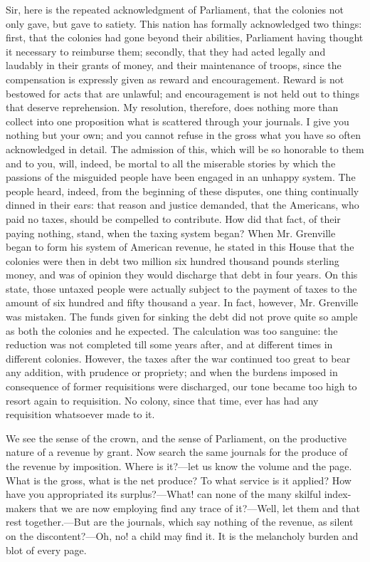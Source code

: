 Sir, here is the repeated acknowledgment of Parliament, that the colonies not only gave, but gave to satiety. This nation has formally acknowledged two things: first, that the colonies had gone beyond their abilities, Parliament having thought it necessary to reimburse them; secondly, that they had acted legally and laudably in their grants of money, and their maintenance of troops, since the compensation is expressly given as reward and encouragement. Reward is not bestowed for acts that are unlawful; and encouragement is not held out to things that deserve reprehension. My resolution, therefore, does nothing more than collect into one proposition what is scattered through your journals. I give you nothing but your own; and you cannot refuse in the gross what you have so often acknowledged in detail. The admission of this, which will be so honorable to them and to you, will, indeed, be mortal to all the miserable stories by which the passions of the misguided people have been engaged in an unhappy system. The people heard, indeed, from the beginning of these disputes, one thing continually dinned in their ears: that reason and justice demanded, that the Americans, who paid no taxes, should be compelled to contribute. How did that fact, of their paying nothing, stand, when the taxing system began? When Mr. Grenville began to form his system of American revenue, he stated in this House that the colonies were then in debt two million six hundred thousand pounds sterling money, and was of opinion they would discharge that debt in four years. On this state, those untaxed people were actually subject to the payment of taxes to the amount of six hundred and fifty thousand a year. In fact, however, Mr. Grenville was mistaken. The funds given for sinking the debt did not prove quite so ample as both the colonies and he expected. The calculation was too sanguine: the reduction was not completed till some years after, and at different times in different colonies. However, the taxes after the war continued too great to bear any addition, with prudence or propriety; and when the burdens imposed in consequence of former requisitions were discharged, our tone became too high to resort again to requisition. No colony, since that time, ever has had any requisition whatsoever made to it.

We see the sense of the crown, and the sense of Parliament, on the productive nature of a revenue by grant. Now search the same journals for the produce of the revenue by imposition. Where is it?—let us know the volume and the page. What is the gross, what is the net produce? To what service is it applied? How have you appropriated its surplus?—What! can none of the many skilful index-makers that we are now employing find any trace of it?—Well, let them and that rest together.—But are the journals, which say nothing of the revenue, as silent on the discontent?—Oh, no! a child may find it. It is the melancholy burden and blot of every page.

